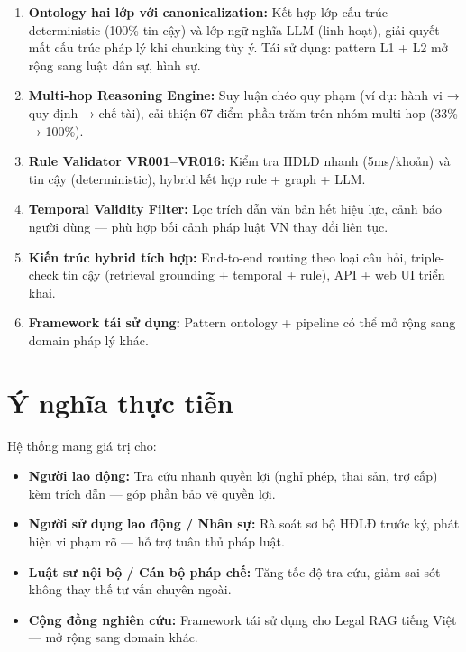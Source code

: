 \documentclass[../DoAn.tex]{subfiles}
\begin{document}
\begin{enumerate}[nosep, leftmargin=*]
    \item \textbf{Ontology hai lớp với canonicalization:} Kết hợp lớp cấu trúc deterministic (100\% tin cậy) và lớp ngữ nghĩa LLM (linh hoạt), giải quyết mất cấu trúc pháp lý khi chunking tùy ý. Tái sử dụng: pattern L1 + L2 mở rộng sang luật dân sự, hình sự.
    
    \item \textbf{Multi-hop Reasoning Engine:} Suy luận chéo quy phạm (ví dụ: hành vi → quy định → chế tài), cải thiện 67 điểm phần trăm trên nhóm multi-hop (33\% → 100\%).
    
    \item \textbf{Rule Validator VR001--VR016:} Kiểm tra HĐLĐ nhanh (5ms/khoản) và tin cậy (deterministic), hybrid kết hợp rule + graph + LLM.
    
    \item \textbf{Temporal Validity Filter:} Lọc trích dẫn văn bản hết hiệu lực, cảnh báo người dùng --- phù hợp bối cảnh pháp luật VN thay đổi liên tục.
    
    \item \textbf{Kiến trúc hybrid tích hợp:} End-to-end routing theo loại câu hỏi, triple-check tin cậy (retrieval grounding + temporal + rule), API + web UI triển khai.
    
    \item \textbf{Framework tái sử dụng:} Pattern ontology + pipeline có thể mở rộng sang domain pháp lý khác.
\end{enumerate}

\section{Ý nghĩa thực tiễn}
\label{section:6.2}

Hệ thống mang giá trị cho:

\begin{itemize}[nosep, leftmargin=*]
    \item \textbf{Người lao động:} Tra cứu nhanh quyền lợi (nghỉ phép, thai sản, trợ cấp) kèm trích dẫn --- góp phần bảo vệ quyền lợi.
    
    \item \textbf{Người sử dụng lao động / Nhân sự:} Rà soát sơ bộ HĐLĐ trước ký, phát hiện vi phạm rõ --- hỗ trợ tuân thủ pháp luật.
    
    \item \textbf{Luật sư nội bộ / Cán bộ pháp chế:} Tăng tốc độ tra cứu, giảm sai sót --- không thay thế tư vấn chuyên ngoài.
    
    \item \textbf{Cộng đồng nghiên cứu:} Framework tái sử dụng cho Legal RAG tiếng Việt --- mở rộng sang domain khác.
\end{itemize}
\end{document}
